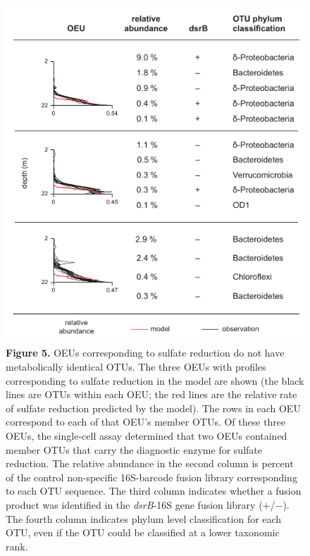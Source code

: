 \begin{figure}[ht]
\centering
\includegraphics{lake/fig/fig5}
\caption*{{\bf Figure 5.} OEUs corresponding to sulfate reduction do not have
metabolically identical OTUs. The three OEUs with profiles corresponding to
sulfate reduction in the model are shown (the black lines are OTUs within each
OEU; the red lines are the relative rate of sulfate reduction predicted by the
model). The rows in each OEU correspond to each of that OEU's member OTUs. Of
these three OEUs, the single-cell assay determined that two OEUs contained
member OTUs that carry the diagnostic enzyme for sulfate reduction. The
relative abundance in the second column is percent of the control non-specific
16S-barcode fusion library corresponding to each OTU sequence. The third column
indicates whether a fusion product was identified in the \textit{dsrB}-16S gene fusion
library ($+$/$-$). The fourth column indicates phylum level classification for each
OTU, even if the OTU could be classified at a lower taxonomic rank.}
\end{figure}
